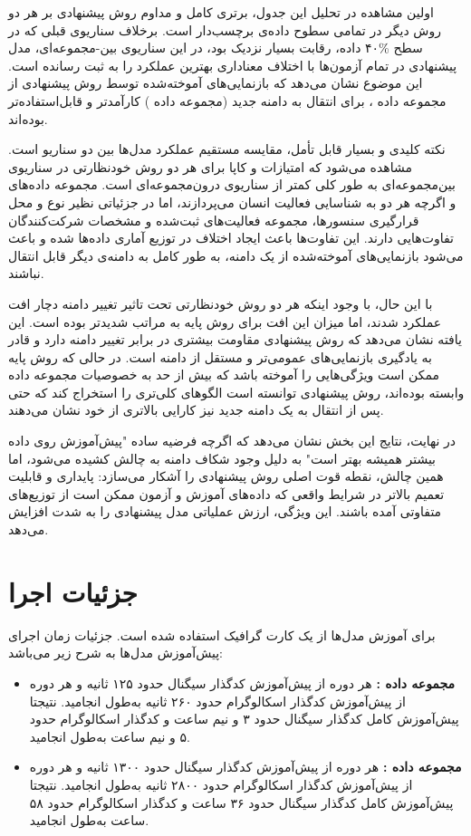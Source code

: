 اولین مشاهده در تحلیل این جدول، برتری کامل و مداوم روش پیشنهادی بر هر دو روش دیگر در تمامی سطوح داده‌ی برچسب‌دار است. برخلاف سناریوی قبلی که در سطح \%۴۰ داده، رقابت بسیار نزدیک بود، در این سناریوی بین-مجموعه‌ای، مدل پیشنهادی در تمام آزمون‌ها با اختلاف معناداری بهترین عملکرد را به ثبت رسانده است. این موضوع نشان می‌دهد که بازنمایی‌های آموخته‌شده توسط روش پیشنهادی از مجموعه داده ، برای انتقال به دامنه جدید (مجموعه داده ) کارآمدتر و قابل‌استفاده‌تر بوده‌اند.

نکته کلیدی و بسیار قابل تأمل، مقایسه مستقیم عملکرد مدل‌ها بین دو سناریو است. مشاهده می‌شود که امتیازات  و کاپا برای هر دو روش خودنظارتی در سناریوی بین‌مجموعه‌ای به طور کلی کمتر از سناریوی درون‌مجموعه‌ای است. مجموعه داده‌های  و  اگرچه هر دو به شناسایی فعالیت انسان می‌پردازند، اما در جزئیاتی نظیر
نوع و محل قرارگیری سنسورها، مجموعه فعالیت‌های ثبت‌شده و مشخصات شرکت‌کنندگان تفاوت‌هایی دارند. این تفاوت‌ها باعث ایجاد اختلاف در توزیع آماری داده‌ها شده و باعث می‌شود بازنمایی‌های آموخته‌شده از یک دامنه، به طور کامل به دامنه‌ی دیگر قابل انتقال نباشند.

با این حال، با وجود اینکه هر دو روش خودنظارتی تحت تاثیر تغییر دامنه دچار افت عملکرد شدند، اما میزان این افت برای روش پایه به مراتب شدیدتر بوده است. این یافته نشان می‌دهد که روش پیشنهادی مقاومت بیشتری در برابر تغییر دامنه دارد و قادر به یادگیری بازنمایی‌های عمومی‌تر و مستقل از دامنه است. در حالی که روش پایه ممکن است ویژگی‌هایی را آموخته باشد که بیش از حد به خصوصیات مجموعه داده  وابسته بوده‌اند، روش پیشنهادی توانسته است الگوهای کلی‌تری را استخراج کند که حتی پس از انتقال به یک دامنه جدید نیز کارایی بالاتری از خود نشان می‌دهند.

در نهایت، نتایج این بخش نشان می‌دهد که اگرچه فرضیه ساده "پیش‌آموزش روی داده بیشتر همیشه بهتر است" به دلیل وجود شکاف دامنه به چالش کشیده می‌شود، اما همین چالش، نقطه قوت اصلی روش پیشنهادی را آشکار می‌سازد: پایداری و قابلیت تعمیم بالاتر در شرایط واقعی که داده‌های آموزش و آزمون ممکن است از توزیع‌های متفاوتی آمده باشند. این ویژگی، ارزش عملیاتی مدل پیشنهادی را به شدت افزایش می‌دهد.

\section{جزئیات اجرا}

برای آموزش مدل‌ها از یک کارت گرافیک  استفاده شده است. جزئیات زمان اجرای پیش‌آموزش مدل‌ها به شرح زیر می‌باشد:
\begin{itemize}
    \item \textbf{مجموعه داده :} هر دوره از پیش‌آموزش کدگذار سیگنال حدود ۱۲۵ ثانیه و هر دوره از پیش‌آموزش کدگذار اسکالوگرام حدود ۲۶۰ ثانیه به‌طول انجامید. نتیجتا پیش‌آموزش کامل کدگذار سیگنال حدود ۳ و نیم ساعت و کدگذار اسکالوگرام حدود ۵ و نیم ساعت به‌طول انجامید.
    \item \textbf{مجموعه داده :} هر دوره از پیش‌آموزش کدگذار سیگنال حدود ۱۳۰۰ ثانیه و هر دوره از پیش‌آموزش کدگذار اسکالوگرام حدود ۲۸۰۰ ثانیه به‌طول انجامید. نتیجتا پیش‌آموزش کامل کدگذار سیگنال حدود ۳۶ ساعت و کدگذار اسکالوگرام حدود ۵۸ ساعت به‌طول انجامید.
\end{itemize}

